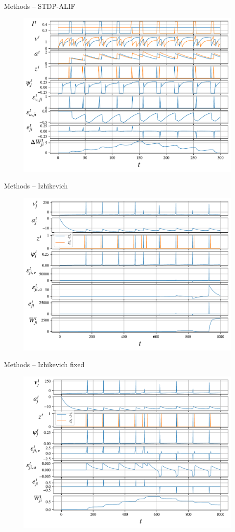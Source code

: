 \documentclass[t]{beamer}
\begin{document}
\begin{frame}{Methods -- STDP-ALIF}
  \begin{figure}[!ht]
    \centering
    \includegraphics[width=.8\linewidth]{stdpalif}
  \end{figure}
\end{frame}


\begin{frame}{Methods -- Izhikevich}
  \begin{figure}[!ht]
    \centering
    \includegraphics[width=0.8\linewidth]{demo_izh}
  \end{figure}
\end{frame}

\begin{frame}{Methods -- Izhikevich fixed}
  \begin{figure}[!ht]
    \centering
    \includegraphics[width=0.8\linewidth]{demo_izh_corrected}
  \end{figure}
\end{frame}
\end{document}
